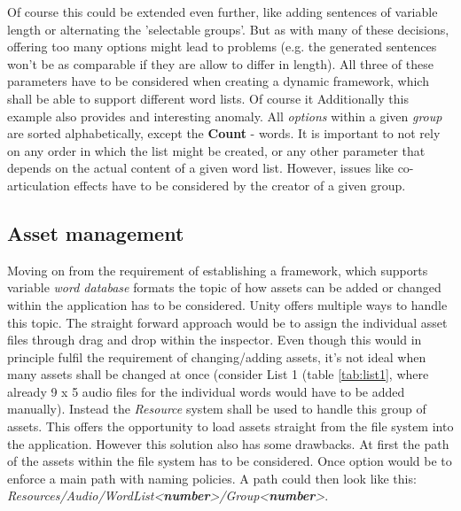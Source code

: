 \documentclass[a4paper,11pt]{article}%
\renewcommand{\\}{\vspace*{0.5\baselineskip} \newline}
\begin{document}
\vspace{5mm}
Of course this could be extended even further, like adding sentences of variable length or alternating the 'selectable groups'. But as with many of these decisions, offering too many options might lead to problems (e.g. the generated sentences won't be as comparable if they are allow to differ in length).
\newline
\newline
All three of these parameters have to be considered when creating a dynamic framework, which shall be able to support different word lists. Of course it 
\newline
Additionally this example also provides and interesting anomaly. All \textit{options} within a given \textit{group} are sorted alphabetically, except the \textbf{Count} - words. It is important to not rely on any order in which the list might be created, or any other parameter that depends on the actual content of a given word list.
\newline
\newline
However, issues like co-articulation effects have to be considered by the creator of a given group.


\subsection{Asset management}
\label{sec:asset_management}
Moving on from the requirement of establishing a framework, which supports variable \textit{word database} formats the topic of how assets can be added or changed within the application has to be considered.
\newline
\newline
Unity offers multiple ways to handle this topic. The straight forward approach would be to assign the individual asset files through drag and drop within the inspector. Even though this would in principle fulfil the requirement of changing/adding assets, it's not ideal when many assets shall be changed at once (consider List 1 (table \ref{tab:list1}, where already 9 x 5 audio files for the individual words would have to be added manually). 
\newline
\newline
Instead the \textit{Resource} system shall be used to handle this group of assets. This offers the opportunity to load assets straight from the file system into the application. However this solution also has some drawbacks. At first the path of the assets within the file system has to be considered. Once option would be to enforce a main path with naming policies. A path could then look like this: \textit{Resources/Audio/WordList<\textbf{number}>/Group<\textbf{number}>}.
\end{document}
